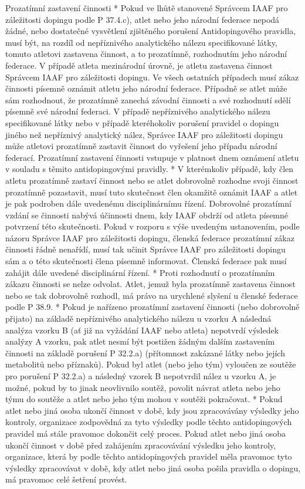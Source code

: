 Prozatímní zastavení činnosti
* Pokud ve lhůtě stanovené Správcem IAAF pro záležitosti dopingu podle P 37.4.c), atlet nebo jeho národní federace nepodá žádné, nebo dostatečné vysvětlení zjištěného porušení Antidopingového pravidla, musí být, na rozdíl od nepříznivého analytického nálezu specifikované látky, tomuto atletovi zastavena činnost, a to prozatímně, rozhodnutím jeho národní federace. V případě atleta mezinárodní úrovně, je atletu zastavena činnost Správcem IAAF pro záležitosti dopingu. Ve všech ostatních případech musí zákaz činnosti písemně oznámit atletu jeho národní federace. Případně se atlet může sám rozhodnout, že prozatímně zanechá závodní činnosti a své rozhodnutí sdělí písemně své národní federaci. V případě nepříznivého analytického nálezu specifikované látky nebo v případě kteréhokoliv porušení pravidel o dopingu jiného než nepříznivý analytický nález, Správce IAAF pro záležitosti dopingu může atletovi prozatímně zastavit činnost do vyřešení jeho případu národní federací. Prozatímní zastavení činnosti vstupuje v platnost dnem oznámení atletu v souladu s těmito antidopingovými pravidly.
* V kterémkoliv případě, kdy člen atletu prozatímně zastaví činnost nebo se atlet dobrovolně rozhodne svoji činnost prozatímně pozastavit, musí tuto skutečnost člen okamžitě oznámit IAAF a atlet je pak podroben dále uvedenému disciplinárnímu řízení. Dobrovolné prozatímní vzdání se činnosti nabývá účinnosti dnem, kdy IAAF obdrží od atleta písemné potvrzení této skutečnosti. Pokud v rozporu s výše uvedeným ustanovením, podle názoru Správce IAAF pro záležitosti dopingu, členská federace prozatímní zákaz činnosti řádně nenařídí, musí tak učinit Správce IAAF pro záležitosti dopingu sám a o této skutečnosti člena písemně informovat. Členská federace pak musí zahájit dále uvedené disciplinární řízení.
* Proti rozhodnutí o prozatímním zákazu činnosti se nelze odvolat. Atlet, jemuž byla prozatímně zastavena činnost nebo se tak dobrovolně rozhodl, má právo na urychlené slyšení u členské federace podle P 38.9.
* Pokud je nařízeno prozatímní zastavení činnosti (nebo dobrovolně přijato) na základě nepříznivého analytického nálezu u vzorku A následná analýza vzorku B (ať již na vyžádání IAAF nebo atleta) nepotvrdí výsledek analýzy A vzorku, pak atlet nesmí být postižen žádným dalším zastavením činnosti na základě porušení P 32.2.a) (přítomnost zakázané látky nebo jejích metabolitů nebo příznaků). Pokud byl atlet (nebo jeho tým) vyloučen ze soutěže pro porušení P 32.2.a) a následný vzorek B nepotvrdil nález u vzorku A, je možné, pokud by to jinak neovlivnilo soutěž, povolit návrat atleta nebo jeho týmu do soutěže a atlet nebo jeho tým mohou v soutěži pokračovat.
* Pokud atlet nebo jiná osoba ukončí činnost v době, kdy jsou zpracovávány výsledky jeho kontroly, organizace zodpovědná za tyto výsledky podle těchto antidopingových pravidel má stále pravomoc dokončit celý proces. Pokud atlet nebo jiná osoba ukončí činnost v době před zahájením zpracovávání výsledku jeho kontroly, organizace, která by podle těchto antidopingových pravidel měla pravomoc tyto výsledky zpracovávat v době, kdy atlet nebo jiná osoba pošila pravidla o dopingu, má pravomoc celé šetření provést.

